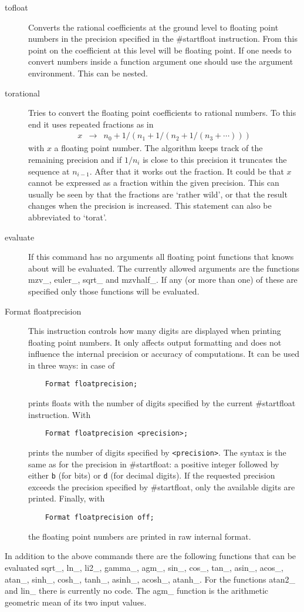 \begin{description}
\item[tofloat] Converts the rational coefficients at the ground level to 
floating point numbers in the precision specified in the \#startfloat 
instruction. From this point on the coefficient at this level will be 
floating point. If one needs to convert numbers inside a function argument 
one should use the argument environment. This can be nested.
\item[torational] Tries to convert the floating point coefficients to 
rational numbers. To this end it uses repeated fractions as in
\begin{eqnarray}
	x & \rightarrow & n_0 + 1/(n_1+1/(n_2+1/(n_3+\cdots))) \nonumber
\end{eqnarray}
with $x$ a floating point number. The algorithm keeps track of the 
remaining precision and if $1/n_i$ is close to this precision it truncates 
the sequence at $n_{i-1}$. After that it works out the fraction. It could 
be that $x$ cannot be expressed as a fraction within the given precision. 
This can usually be seen by that the fractions are `rather wild', or that 
the result changes when the precision is increased. This statement can also 
be abbreviated to `torat'.
\item[evaluate] If this command has no arguments all floating point 
functions that \FORM{} knows about will be evaluated. The currently allowed 
arguments are the functions mzv\_, euler\_, sqrt\_ and mzvhalf\_. If any 
(or more than one) of these are specified only those functions will be 
evaluated.
\item[Format floatprecision] This instruction controls how many digits are 
displayed when printing floating point numbers. It only affects output 
formatting and does not influence the internal precision or accuracy of 
computations. It can be used in three ways: in case of 
\begin{verbatim}
    Format floatprecision;
\end{verbatim}
\FORM{} prints floats with the number of digits specified by the current 
\#startfloat instruction. With
\begin{verbatim}
    Format floatprecision <precision>;
\end{verbatim}
\FORM{} prints the number of digits specified by \texttt{<precision>}. 
The syntax is the same as for the precision in \#startfloat: a positive 
integer followed by either \texttt{b} (for bits) or \texttt{d} (for decimal 
digits). If the requested precision exceeds the precision specified by 
\#startfloat, only the available digits are printed. Finally, with 
\begin{verbatim}
    Format floatprecision off;
\end{verbatim}
the floating point numbers are printed in raw internal format. 
\end{description}
In addition to the above commands there are the following functions that 
can be evaluated sqrt\_, ln\_, li2\_, gamma\_, agm\_, sin\_, cos\_, tan\_,
asin\_, acos\_, atan\_, sinh\_, cosh\_, tanh\_, asinh\_, acosh\_, atanh\_.
For the functions atan2\_ and lin\_ there is currently no code.
The agm\_ function is the arithmetic geometric mean of its two input 
values.

